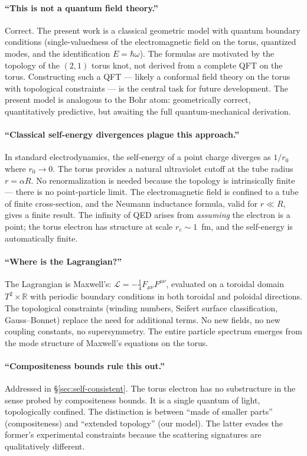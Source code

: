 \documentclass[11pt,a4paper]{article}
\begin{document}
\paragraph{``This is not a quantum field theory.''}
Correct. The present work is a classical geometric model with quantum boundary conditions (single-valuedness of the electromagnetic field on the torus, quantized modes, and the identification $E = \hbar\omega$). The formulas are motivated by the topology of the $(2,1)$ torus knot, not derived from a complete QFT on the torus. Constructing such a QFT --- likely a conformal field theory on the torus with topological constraints --- is the central task for future development. The present model is analogous to the Bohr atom: geometrically correct, quantitatively predictive, but awaiting the full quantum-mechanical derivation.

\paragraph{``Classical self-energy divergences plague this approach.''}
In standard electrodynamics, the self-energy of a point charge diverges as $1/r_0$ where $r_0 \to 0$. The torus provides a natural ultraviolet cutoff at the tube radius $r = \alpha R$. No renormalization is needed because the topology is intrinsically finite --- there is no point-particle limit. The electromagnetic field is confined to a tube of finite cross-section, and the Neumann inductance formula, valid for $r \ll R$, gives a finite result. The infinity of QED arises from \emph{assuming} the electron is a point; the torus electron has structure at scale $r_e \sim 1$~fm, and the self-energy is automatically finite.

\paragraph{``Where is the Lagrangian?''}
The Lagrangian is Maxwell's: $\mathcal{L} = -\tfrac{1}{4}F_{\mu\nu}F^{\mu\nu}$, evaluated on a toroidal domain $T^2 \times \mathbb{R}$ with periodic boundary conditions in both toroidal and poloidal directions. The topological constraints (winding numbers, Seifert surface classification, Gauss--Bonnet) replace the need for additional terms. No new fields, no new coupling constants, no supersymmetry. The entire particle spectrum emerges from the mode structure of Maxwell's equations on the torus.

\paragraph{``Compositeness bounds rule this out.''}
Addressed in \S\ref{sec:self-consistent}. The torus electron has no substructure in the sense probed by compositeness bounds. It is a single quantum of light, topologically confined. The distinction is between ``made of smaller parts'' (compositeness) and ``extended topology'' (our model). The latter evades the former's experimental constraints because the scattering signatures are qualitatively different.
\end{document}
